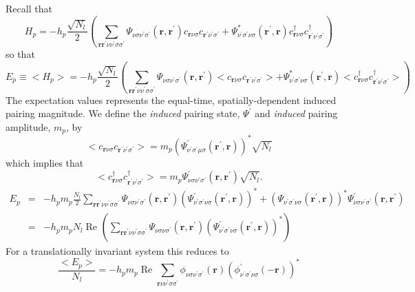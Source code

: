Recall that
\begin{equation}
H_{p}  = -h_p\frac{\sqrt{N_l}}{2} 
\left( \sum_{\mathbf{r}\mathbf{r}^{\prime}
\nu\nu^{\prime}\sigma\sigma^{\prime}}  
\Psi_{\nu\sigma\nu^{\prime}\sigma^{\prime}}(\mathbf{r},\mathbf{r}^{\prime})
 c_{\mathbf{r}\nu\sigma}c_{\mathbf{r}^{\prime}\nu^{\prime}\sigma^{\prime}} + 
\Psi_{\nu^{\prime}\sigma^{\prime}\nu\sigma}^*(\mathbf{r}^{\prime},\mathbf{r})
c^{\dagger}_{\mathbf{r}\nu\sigma}
 c^{\dagger}_{\mathbf{r}^{\prime}\nu^{\prime}\sigma^{\prime}}\right)
\end{equation}
so that
\begin{equation}
E_p \equiv <H_p> 
= -h_p\frac{\sqrt{N_l}}{2} 
\left( \sum_{\mathbf{r}\mathbf{r}^{\prime}\nu\nu^{\prime}\sigma\sigma^{\prime}}  
\Psi_{\nu\sigma\nu^{\prime}\sigma^{\prime}}(\mathbf{r},\mathbf{r}^{\prime})
<c_{\mathbf{r}\nu\sigma}c_{\mathbf{r}^{\prime}\nu^{\prime}\sigma^{\prime}}> + 
\Psi_{\nu^{\prime}\sigma^{\prime}\nu\sigma}^*(\mathbf{r}^{\prime},\mathbf{r})
 <c^{\dagger}_{\mathbf{r}\nu\sigma}
 c^{\dagger}_{\mathbf{r}^{\prime}\nu^{\prime}\sigma^{\prime}}>\right)
\end{equation}
The expectation values represents the
equal-time, spatially-dependent
induced pairing magnitude.
We define the \textit{induced} pairing state, $\Psi^{\prime}$
and \textit{induced} pairing amplitude, $m_p $, by
\begin{equation}
<c_{\mathbf{r}\nu\sigma}c_{\mathbf{r}^{\prime}\nu^{\prime}\sigma^{\prime}}>  =  m_p 
\left(\Psi^{\prime}_{\nu^{\prime}\sigma^{\prime}\mu\sigma}(\mathbf{r}^{\prime},
\mathbf{r})\right)^* \sqrt{N_l}
\end{equation}
which implies that
\begin{equation}
<c^{\dagger}_{\mathbf{r}\nu\sigma} 
c^{\dagger}_{\mathbf{r}^{\prime}\nu^{\prime}\sigma^{\prime}}>  = 
m_p \Psi^{\prime}_{\nu\sigma\nu^{\prime}\sigma^{\prime}}(\mathbf{r},\mathbf{r}^{\prime})
\sqrt{N_l}.
\end{equation}
\begin{eqnarray}
E_p & =  & - h_p m_p \frac{N_l}{2} 
\sum_{\mathbf{r}\mathbf{r}^{\prime}\nu\nu^{\prime}\sigma\sigma^{\prime}} 
\Psi_{\nu\sigma\nu^{\prime}\sigma^{\prime}}(\mathbf{r},\mathbf{r}^{\prime}) 
\left(\Psi^{\prime}_{\nu^{\prime}\sigma^{\prime}\nu\sigma}
(\mathbf{r}^{\prime},\mathbf{r})\right)^* +
\left(\Psi_{\nu^{\prime}\sigma^{\prime}\nu\sigma}(\mathbf{r}^{\prime},
\mathbf{r})\right)^* 
\Psi^{\prime}_{\nu\sigma\nu^{\prime}\sigma^{\prime}}(\mathbf{r},\mathbf{r}^{\prime})
\\
& = &
- h_p m_p N_l \;\textrm{Re }
\left(\sum_{\mathbf{r}\mathbf{r}^{\prime}\nu\nu^{\prime}\sigma\sigma^{\prime}} 
\Psi_{\nu\sigma\nu\sigma^{\prime}}(\mathbf{r},\mathbf{r}^{\prime}) 
\left(\Psi^{\prime}_{\nu^{\prime}\sigma^{\prime}\nu\sigma}
(\mathbf{r}^{\prime},\mathbf{r})\right)^* \right)  
\end{eqnarray} 
For a translationally invariant system this reduces to
\begin{equation}
\frac{<E_p>}{N_l}  =  - 
h_p m_p\;\textrm{Re } \sum_{\mathbf{r}\nu\nu^{\prime}\sigma\sigma^{\prime}}
    \phi_{\nu\sigma\nu^{\prime}\sigma^{\prime}}(\mathbf{r}) 
\left(\phi^{\prime}_{\nu^{\prime}\sigma^{\prime}\nu\sigma}(-\mathbf{r})\right)^* 
\end{equation}

